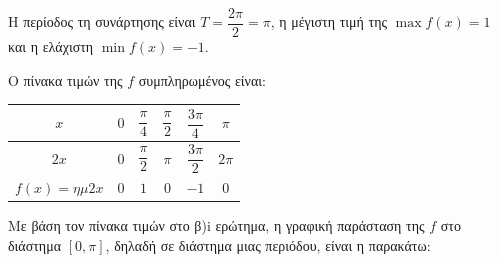 \begin{alist}
\item Η περίοδος τη συνάρτησης είναι $T = \dfrac{2\pi}{2} = \pi$, η μέγιστη τιμή της $\max f(x) = 1$ και η ελάχιστη $\min f(x) = -1$.

\item
\begin{rlist}
\item Ο πίνακα τιμών της $f$ συμπληρωμένος είναι:
\begin{center}
\renewcommand{\arraystretch}{2}
\begin{tabular}{|c|c|c|c|c|c|}
\hline
$x$ & $0$ & $\dfrac{\pi}{4}$ & $\dfrac{\pi}{2}$ & $\dfrac{3\pi}{4}$ & $\pi$ \\ \hline
$2x$ & $0$ & $\dfrac{\pi}{2}$ & $\pi$ & $\dfrac{3\pi}{2}$ & $2\pi$ \\ \hline
$f(x) = \eta\mu 2x$ & $0$ & $1$ & $0$ & $-1$ & $0$ \\ \hline
\end{tabular}
\end{center}

\item Με βάση τον πίνακα τιμών στο β)i ερώτημα, η γραφική παράσταση της $f$ στο διάστημα $[0, \pi]$, δηλαδή σε διάστημα μιας περιόδου, είναι η παρακάτω:
\begin{center}
\end{center}
\end{rlist}
\end{alist}

